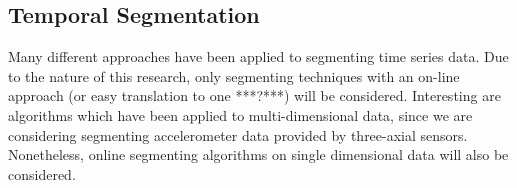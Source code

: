 
\subsection{Temporal Segmentation}\label{sec:lit_review_temporal_segmentation}
Many different approaches have been applied to segmenting time series data.
Due to the nature of this research, only segmenting techniques with an on-line approach (or easy translation to one ***?***) will be considered.
Interesting are algorithms which have been applied to multi-dimensional data, since we are considering segmenting accelerometer data provided by three-axial sensors.
Nonetheless, online segmenting algorithms on single dimensional data will also be considered.




